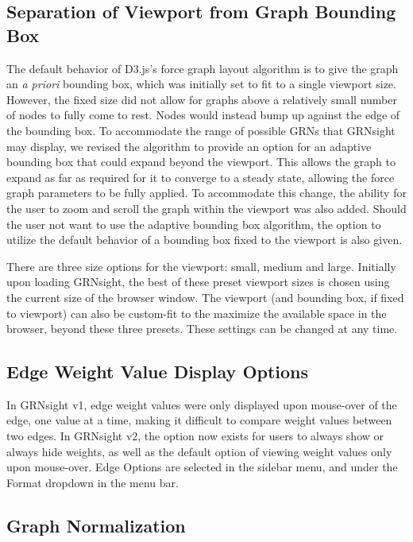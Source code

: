 \documentclass[sigconf,review]{acmart}
\begin{document}
\subsection{Separation of Viewport from Graph Bounding Box}
The default behavior of D3.js's force graph layout algorithm is to give the graph an \emph{a priori} bounding box, which was initially set to fit to a single viewport size. However, the fixed size did not allow for graphs above a relatively small number of nodes to fully come to rest. Nodes would instead bump up against the edge of the bounding box. To accommodate the range of possible GRNs that GRNsight may display, we revised the algorithm to provide an option for an adaptive bounding box that could expand beyond the viewport. This allows the graph to expand as far as required for it to converge to a steady state, allowing the force graph parameters to be fully applied. To accommodate this change, the ability for the user to zoom and scroll the graph within the viewport was also added. Should the user not want to use the adaptive bounding box algorithm, the option to utilize the default behavior of a bounding box fixed to the viewport is also given.

There are three size options for the viewport: small, medium and large. Initially upon loading GRNsight, the best of these preset viewport sizes is chosen using the current size of the browser window. The viewport (and bounding box, if fixed to viewport) can also be custom-fit to the maximize the available space in the browser, beyond these three presets. These settings can be changed at any time. 

\subsection{Edge Weight Value Display Options}
In GRNsight v1, edge weight values were only displayed upon mouse-over of the edge, one value at a time, making it difficult to compare weight values between two edges. In GRNsight v2, the option now exists for users to always show or always hide weights, as well as the default option of viewing weight values only upon mouse-over. Edge Options are selected in the sidebar menu, and under the Format dropdown in the menu bar.

\subsection{Graph Normalization}
\end{document}
